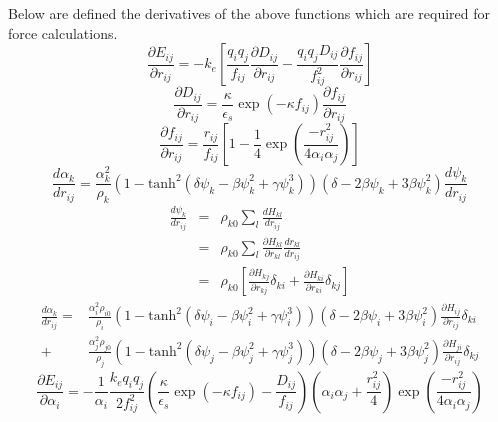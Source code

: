 Below are defined the derivatives of the above functions which are required for force calculations.
\begin{equation}
\frac{\partial E_{ij}}{\partial r_{ij}} = - k_e \left[
\frac{q_i q_j}{f_{ij}} \frac{\partial D_{ij}}{\partial r_{ij}}  
 - 
 \frac{q_i q_j D_{ij}}{f_{ij}^2} \frac{\partial f_{ij}}{\partial r_{ij}}
\right]
\end{equation}
\begin{equation}
\frac{\partial D_{ij}}{\partial r_{ij}} = \frac{\kappa}{\epsilon_s} \exp{\left(-\kappa f_{ij}\right)\frac{\partial f_{ij}}{\partial r_{ij}}}
\end{equation}
\begin{equation}
\frac{\partial f_{ij}}{\partial r_{ij}} = \frac{r_{ij}}{f_{ij}} \left[1 - \frac{1}{4} \exp{\left(\frac{-r_{ij}^2}{4 \alpha_i \alpha_j}\right)} \right]
\end{equation}
\begin{equation}
\frac{d \alpha_k}{d r_{ij}} = \frac{\alpha_k^2}{\rho_k}\left(1-\textrm{tanh}^2\left(\delta \psi_k - \beta \psi_k^2 + \gamma \psi_k^3\right)\right)
\left( \delta - 2\beta\psi_k+3\beta\psi_k^2\right) \frac{d \psi_k}{d r_{ij}}
\end{equation}
\begin{eqnarray}
\frac{d \psi_k}{d r_{ij}}
&=&\rho_{k0} \sum_l \frac{d H_{kl}}{d r_{ij}} \\
&=&\rho_{k0} \sum_l \frac{\partial H_{kl}}{\partial r_{kl}}\frac{d r_{kl}}{d r_{ij}}\\
&=&\rho_{k0} \left[ \frac{\partial H_{kj}}{\partial r_{kj}}\delta_{ki} + \frac{\partial H_{ki}}{\partial r_{ki}}\delta_{kj} \right]
\end{eqnarray}
\begin{eqnarray}
\frac{d \alpha_k}{d r_{ij}} =
& \frac{\alpha_i^2\rho_{i0}}{\rho_i}\left(1-\textrm{tanh}^2\left(\delta \psi_i - \beta \psi_i^2 + \gamma \psi_i^3\right)\right)
\left( \delta - 2\beta\psi_i+3\beta\psi_i^2\right) \frac{\partial H_{ij}}{\partial r_{ij}} \delta_{ki}\nonumber \\
+ &
\frac{\alpha_j^2\rho_{j0}}{\rho_j}\left(1-\textrm{tanh}^2\left(\delta \psi_j - \beta \psi_j^2 + \gamma \psi_j^3\right)\right)
\left( \delta - 2\beta\psi_j+3\beta\psi_j^2\right) \frac{\partial H_{ji}}{\partial r_{ij}} \delta_{kj}
\end{eqnarray}
\begin{equation}
\frac{\partial E_{ij}}{\partial \alpha_i} = -\frac{1}{\alpha_i}\frac{k_e q_i q_j}{2 f_{ij}^2}\left( \frac{\kappa}{\epsilon_s}\exp{\left(-\kappa f_{ij}\right)} - \frac{D_{ij}}{f_{ij}}\right)
\left(\alpha_i\alpha_j + \frac{r_{ij}^2}{4}\right)\exp{\left(\frac{-r_{ij}^2}{4 \alpha_i \alpha_j}\right)}
\end{equation}
